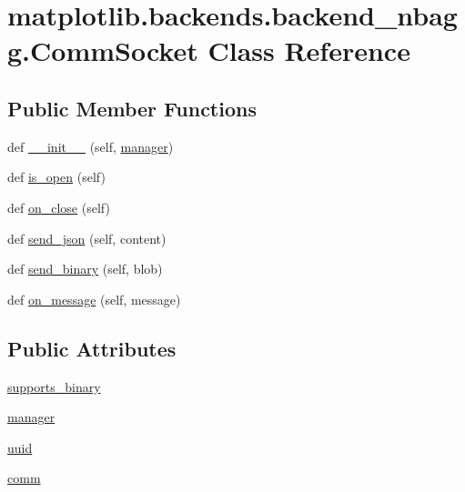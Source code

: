 \hypertarget{classmatplotlib_1_1backends_1_1backend__nbagg_1_1CommSocket}{}\section{matplotlib.\+backends.\+backend\+\_\+nbagg.\+Comm\+Socket Class Reference}
\label{classmatplotlib_1_1backends_1_1backend__nbagg_1_1CommSocket}
\subsection*{Public Member Functions}
\begin{DoxyCompactItemize}
\item 
def \hyperlink{classmatplotlib_1_1backends_1_1backend__nbagg_1_1CommSocket_a0d4d24c80f1e8b2c729159db5172d11f}{\+\_\+\+\_\+init\+\_\+\+\_\+} (self, \hyperlink{classmatplotlib_1_1backends_1_1backend__nbagg_1_1CommSocket_aa425f5864211cd83e421fe39b4f2ad67}{manager})
\item 
def \hyperlink{classmatplotlib_1_1backends_1_1backend__nbagg_1_1CommSocket_af3c42ae24d3f16965203e8f73807804c}{is\+\_\+open} (self)
\item 
def \hyperlink{classmatplotlib_1_1backends_1_1backend__nbagg_1_1CommSocket_a61aa04ac1a8894cdf5f61833525e0500}{on\+\_\+close} (self)
\item 
def \hyperlink{classmatplotlib_1_1backends_1_1backend__nbagg_1_1CommSocket_adcb0049f0e71fe8fd1e7c0f306aadff8}{send\+\_\+json} (self, content)
\item 
def \hyperlink{classmatplotlib_1_1backends_1_1backend__nbagg_1_1CommSocket_abdabbec2038acae6ce7001b96b9f8e57}{send\+\_\+binary} (self, blob)
\item 
def \hyperlink{classmatplotlib_1_1backends_1_1backend__nbagg_1_1CommSocket_a0c7fe65c894b53e96d4b7707e96196fc}{on\+\_\+message} (self, message)
\end{DoxyCompactItemize}
\subsection*{Public Attributes}
\begin{DoxyCompactItemize}
\item 
\hyperlink{classmatplotlib_1_1backends_1_1backend__nbagg_1_1CommSocket_a1c353abd1b21a98263db8a1f39fa3d49}{supports\+\_\+binary}
\item 
\hyperlink{classmatplotlib_1_1backends_1_1backend__nbagg_1_1CommSocket_aa425f5864211cd83e421fe39b4f2ad67}{manager}
\item 
\hyperlink{classmatplotlib_1_1backends_1_1backend__nbagg_1_1CommSocket_a146e2a6e4e69325a0a99e6b94115f910}{uuid}
\item 
\hyperlink{classmatplotlib_1_1backends_1_1backend__nbagg_1_1CommSocket_ae70c65325f63d0cbab8c44670476aa88}{comm}
\end{DoxyCompactItemize}


